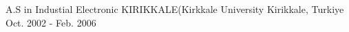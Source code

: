 

\begin{cventries}

  \cventry
    {A.S in Industial Electronic} %
    {KIRIKKALE(Kirkkale University}%
    {Kirikkale, Turkiye} %
    {Oct. 2002 - Feb. 2006} %
\end{cventries}
